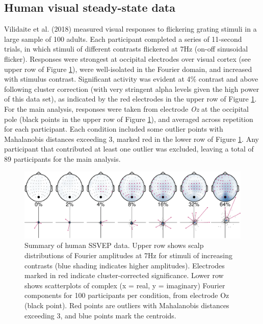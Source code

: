 \documentclass[]{article}
\begin{document}
\hypertarget{human-visual-steady-state-data}{%
\subsection{Human visual steady-state data}\label{human-visual-steady-state-data}}

Vilidaite et al. (2018) measured visual responses to flickering grating stimuli in a large sample of 100 adults. Each participant completed a series of 11-second trials, in which stimuli of different contrasts flickered at 7Hz (on-off sinusoidal flicker). Responses were strongest at occipital electrodes over visual cortex (see upper row of Figure \ref{fig:humanSSVEP}), were well-isolated in the Fourier domain, and increased with stimulus contrast. Significant activity was evident at 4\% contrast and above following cluster correction (with very stringent alpha levels given the high power of this data set), as indicated by the red electrodes in the upper row of Figure \ref{fig:humanSSVEP}. For the main analysis, responses were taken from electrode \emph{Oz} at the occipital pole (black points in the upper row of Figure \ref{fig:humanSSVEP}), and averaged across repetition for each participant. Each condition included some outlier points with Mahalanobis distances exceeding 3, marked red in the lower row of Figure \ref{fig:humanSSVEP}. Any participant that contributed at least one outlier was excluded, leaving a total of 89 participants for the main analysis.

\begin{figure}

{\centering \includegraphics{manuscript_files/figure-latex/humanSSVEP-1} 

}

\caption{Summary of human SSVEP data. Upper row shows scalp distributions of Fourier amplitudes at 7Hz for stimuli of increasing contrasts (blue shading indicates higher amplitudes). Electrodes marked in red indicate cluster-corrected significance.  Lower row shows scatterplots of complex (x = real, y = imaginary) Fourier components for 100 participants per condition, from electrode Oz (black point). Red points are outliers with Mahalanobis distances exceeding 3, and blue points mark the centroids.}\label{fig:humanSSVEP}
\end{figure}
\end{document}
